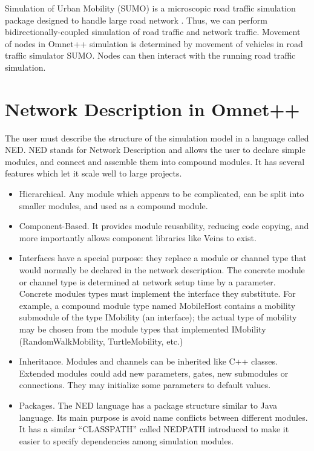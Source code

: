 Simulation of Urban Mobility (SUMO) is a microscopic road traffic simulation
package designed to handle large road network \cite{sumo}. Thus, we can perform
bidirectionally-coupled simulation of road traffic and network traffic. Movement
of nodes in Omnet++ simulation is determined by movement of vehicles in road
traffic simulator SUMO. Nodes can then interact with the running road traffic
simulation.

\section{Network Description in Omnet++}

The user must describe the structure of the simulation model in a language
called NED. NED stands for Network Description and allows the user to declare
simple modules, and connect and assemble them into compound modules. It has
several features which let it scale well to large projects.

\begin{itemize}
  \item Hierarchical. Any module which appears to be complicated, can be
  split into smaller modules, and used as a compound module.
  \item Component-Based. It provides module reusability, reducing code
  copying, and more importantly allows component libraries like Veins to exist.
  \item Interfaces have a special purpose: they replace a module or channel type
  that would normally be declared in the network description. The concrete
  module or channel type is determined at network setup time by a parameter.
  Concrete modules types must implement the interface they substitute. For
  example, a compound module type named MobileHost contains a mobility submodule
  of the type IMobility (an interface); the actual type of mobility may be
  chosen from the module types that implemented IMobility (RandomWalkMobility,
  TurtleMobility, etc.)
  \item Inheritance. Modules and channels can be inherited like C++ classes.
  Extended modules could add new parameters, gates, new submodules
  or connections. They may initialize some parameters to default values.
  \item Packages. The NED language has a package structure similar to Java
  language. Its main purpose is avoid name conflicts between different modules.
  It has a similar ``CLASSPATH'' called NEDPATH introduced to make it easier to
  specify dependencies among simulation modules.
\end{itemize}

